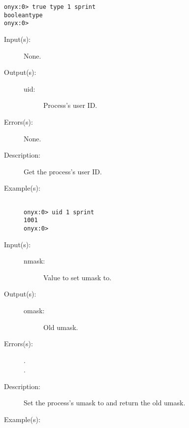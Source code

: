 \begin{description}
\begin{description}
\begin{verbatim}
onyx:0> true type 1 sprint
booleantype
onyx:0>
		\end{verbatim}
	\end{description}
\label{systemdict:uid}
\item[{\onyxop{--}{uid}{uid}}: ]
	\begin{description}\item[]
	\item[Input(s): ] None.
	\item[Output(s): ]
		\begin{description}\item[]
		\item[uid: ]
			Process's user ID.
		\end{description}
	\item[Errors(s): ] None.
	\item[Description: ]
		Get the process's user ID.
	\item[Example(s): ]\begin{verbatim}

onyx:0> uid 1 sprint
1001
onyx:0>
		\end{verbatim}
	\end{description}
\label{systemdict:umask}
\item[{\onyxop{nmask}{umask}{omask}}: ]
	\begin{description}\item[]
	\item[Input(s): ]
		\begin{description}\item[]
		\item[nmask: ]
			Value to set umask to.
		\end{description}
	\item[Output(s): ]
		\begin{description}\item[]
		\item[omask: ]
			Old umask.
		\end{description}
	\item[Errors(s): ]
		\begin{description}\item[]
		\item[.]
		\item[.]
		\end{description}
	\item[Description: ]
		Set the process's umask to  and return the old
		umask.
	\item[Example(s): ]\begin{verbatim}


\end{verbatim}
\end{description}
\end{description}
